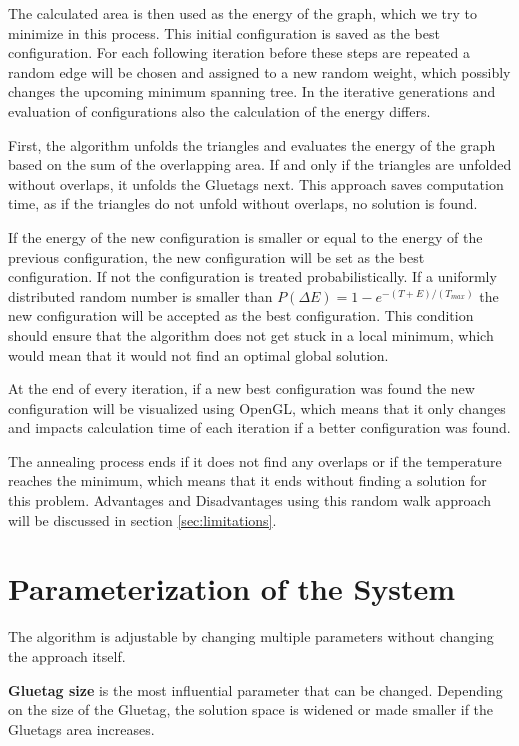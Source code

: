 \documentclass[draft,final]{vutinfth} %
\begin{document}
The calculated area is then used as the energy of the graph, which we try to minimize in this process. This initial configuration is saved as the best configuration. For each following iteration before these steps are repeated a random edge will be chosen and assigned to a new random weight, which possibly changes the upcoming minimum spanning tree. In the iterative generations and evaluation of configurations also the calculation of the energy differs. 

First, the algorithm unfolds the triangles and evaluates the energy of the graph based on the sum of the overlapping area. If and only if the triangles are unfolded without overlaps, it unfolds the Gluetags next. This approach saves computation time, as if the triangles do not unfold without overlaps, no solution is found.

If the energy of the new configuration is smaller or equal to the energy of the previous configuration, the new configuration will be set as the best configuration. If not the configuration is treated probabilistically. If a uniformly distributed random number is smaller than $P(\Delta E) = 1 - e^{-(T + E)/(T_{max})}$ the new configuration will be accepted as the best configuration. This condition should ensure that the algorithm does not get stuck in a local minimum, which would mean that it would not find an optimal global solution.

At the end of every iteration, if a new best configuration was found the new configuration will be visualized using OpenGL, which means that it only changes and impacts calculation time of each iteration if a better configuration was found. 

The annealing process ends if it does not find any overlaps or if the temperature reaches the minimum, which means that it ends without finding a solution for this problem. Advantages and Disadvantages using this random walk approach will be discussed in section \ref{sec:limitations}.

\section{Parameterization of the System}
The algorithm is adjustable by changing multiple parameters without changing the approach itself.

\textbf{Gluetag size} is the most influential parameter that can be changed. Depending on the size of the Gluetag, the solution space is widened or made smaller if the Gluetags area increases.
\end{document}
